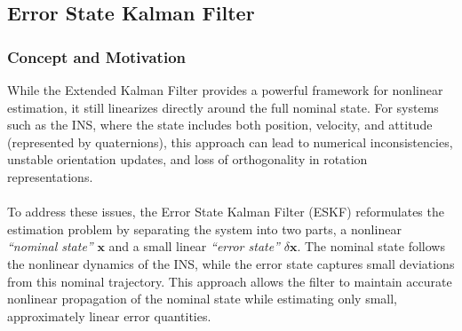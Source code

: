 \subsection{Error State Kalman Filter}
\subsubsection{Concept and Motivation}
While the Extended Kalman Filter provides a powerful framework for nonlinear estimation, it still linearizes directly around the full nominal state. For systems such as the INS, where the state includes both position, velocity, and attitude (represented by quaternions), this approach can lead to numerical inconsistencies, unstable orientation updates, and loss of orthogonality in rotation representations.  
\\ \\
To address these issues, the Error State Kalman Filter (ESKF) reformulates the estimation problem by separating the system into two parts, a nonlinear \textit{``nominal state''} $\mathbf{x}$ and a small linear \textit{``error state''} $\delta\mathbf{x}$. The nominal state follows the nonlinear dynamics of the INS, while the error state captures small deviations from this nominal trajectory. This approach allows the filter to maintain accurate nonlinear propagation of the nominal state while estimating only small, approximately linear error quantities. 



